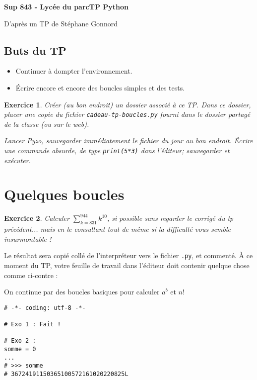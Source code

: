 \documentclass[a4paper,10pt]{article}
\newtheorem{exo}{\sc Exercice}
{\theorembodyfont{\rmfamily}\newtheorem{exo-f}{\sc Exercice}}
\renewcommand{\[}{[\![}
\renewcommand{\]}{]\!]}
\newcommand{\dsum}{\sum\limits}
\renewcommand{\=}{\mathop{=}\limits}
\begin{document}
{\bf\noindent Sup 843 - Lycée du parc\hfill TP Python}
\vskip 2mm

\begin{center}
\Large
{}
\vskip 3mm\small D'après un TP de Stéphane Gonnord 
\end{center}


\subsection*{Buts du TP}
\begin{itemize}
\item Continuer à dompter l'environnement.
\item Écrire encore et encore des boucles simples et des tests.
\end{itemize}
\medskip



\begin{exo}
  Créer (au bon endroit) un dossier associé à ce TP. Dans ce dossier,
  placer une copie du
  fichier \verb+cadeau-tp-boucles.py+ fourni dans le dossier
  partagé de la classe (ou sur le web).

  Lancer Pyzo, sauvegarder immédiatement le fichier du jour au bon
  endroit. Écrire une commande absurde, de type \verb+print(5*3)+ dans
  l'éditeur; sauvegarder et exécuter.
\end{exo}

\section{Quelques boucles}

\begin{minipage}[t]{0.5\linewidth}
\begin{exo}
  Calculer $\dsum_{k=831}^{944}k^{10}$, si possible sans regarder le
  corrigé du tp précédent... mais en le consultant tout de même  si la
  difficulté  vous semble insurmontable ! 
  
 \end{exo}

Le résultat sera copié collé de l'interpréteur vers
 le fichier \verb+.py+, et commenté.
À ce moment du TP, votre feuille de travail dans l'éditeur doit
contenir quelque chose comme ci-contre :


On continue par des boucles basiques pour calculer $a^b$ et $n!$




\end{minipage}\hfill
\begin{minipage}[t]{0.45\linewidth}
\begin{verbatim}
# -*- coding: utf-8 -*-

# Exo 1 : Fait !

# Exo 2 :
somme = 0
...
# >>> somme
# 36724191150365100572161020220825L

\end{verbatim}
\end{minipage}
\end{document}
